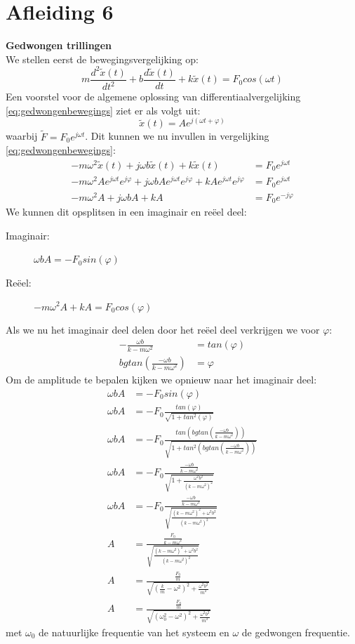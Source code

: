 \documentclass[a4paper,kul]{kulakarticle} %
\begin{document}
\section{Afleiding 6}
\textbf{Gedwongen trillingen}\\
We stellen eerst de bewegingsvergelijking op:
\begin{equation}
	m\frac{d^2\widetilde{x}(t)}{dt^2}+b\frac{d\widetilde{x}(t)}{dt}+k\widetilde{x}(t) = F_0cos(\omega t)
	\label{eq:gedwongenbewegings}
\end{equation}
Een voorstel voor de algemene oplossing van differentiaalvergelijking \ref{eq:gedwongenbewegings} ziet er als volgt uit:
\begin{equation*}
	\widetilde{x}(t) = Ae^{j(\omega t +\varphi)}
\end{equation*}
waarbij $\widetilde{F} = F_0e^{j\omega t}$.
Dit kunnen we nu invullen in vergelijking \ref{eq:gedwongenbewegings}:
\begin{align*}
	-m\omega^2\widetilde{x}(t)+j\omega b\widetilde{x}(t)+k\widetilde{x}(t) & =F_0e^{j\omega t}\\
	-m\omega^2Ae^{j\omega t}e^{j\varphi}+j\omega bAe^{j\omega t}e^{j\varphi}+kAe^{j\omega t}e^{j\varphi} & =F_0e^{j\omega t}\\
	-m\omega^2A+j\omega bA+kA & =F_0e^{-j\varphi} 
\end{align*}
We kunnen dit opsplitsen in een imaginair en reëel deel:
\begin{description}
	\item[Imaginair:]$\omega bA = -F_0sin(\varphi)$
	\item[Reëel:] $-m\omega^2 A +kA = F_0cos(\varphi)$
\end{description}
Als we nu het imaginair deel delen door het reëel deel verkrijgen we voor $\varphi$:
\begin{align*}
	-\frac{\omega b}{k-m\omega^2} &= tan(\varphi)\\
	bgtan(\frac{-\omega b}{k-m\omega^2}) & =\varphi
\end{align*}
Om de amplitude te bepalen kijken we opnieuw naar het imaginair deel:
\begin{align*}
	\omega bA &= -F_0sin(\varphi)\\
	\omega bA &= -F_0\frac{tan(\varphi)}{\sqrt{1+tan^2(\varphi)}}\\
	\omega bA &= -F_0\frac{tan(bgtan(\frac{-\omega b}{k-m\omega^2}))}{\sqrt{1+tan^2(bgtan(\frac{-\omega b}{k-m\omega^2}))}}\\
	\omega bA &= -F_0\frac{\frac{-\omega b}{k-m\omega^2}}{\sqrt{1+\frac{\omega^2 b^2}{(k-m\omega^2)^2}}}\\
	\omega bA &= -F_0\frac{\frac{-\omega b}{k-m\omega^2}}{\sqrt{\frac{(k-m\omega^2)^2+\omega^2 b^2}{(k-m\omega^2)^2}}}\\
	A &= \frac{\frac{F_0}{k-m\omega^2}}{\sqrt{\frac{(k-m\omega^2)^2+\omega^2 b^2}{(k-m\omega^2)^2}}}\\
	A &= \frac{\frac{F_0}{m}}{\sqrt{(\frac{k}{m}-\omega^2)^2+\frac{\omega^2b^2}{m^2}}}\\
	A &= \frac{\frac{F_0}{m}}{\sqrt{(\omega_0^2-\omega^2)^2+\frac{\omega^2b^2}{m^2}}}	
\end{align*}
met $\omega_0$ de natuurlijke frequentie van het systeem en $\omega$ de gedwongen frequentie.
\newpage
\end{document}

